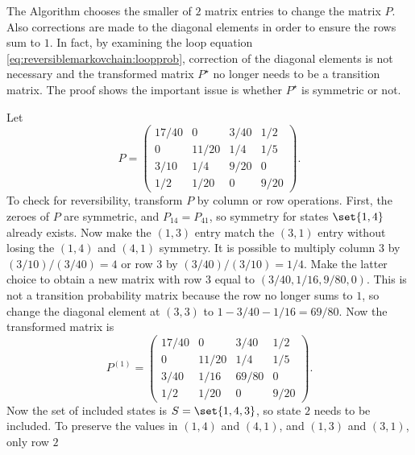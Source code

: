 \documentclass[12pt]{article}
\begin{document}
\begin{remark}
    The Algorithm chooses the smaller of \( 2 \) matrix entries to
    change the matrix \( P \).  Also corrections are made to the
    diagonal elements in order to ensure the rows sum to \( 1 \).  In
    fact, by examining the loop equation \eqref{eq:reversiblemarkovchain:loopprob},
    correction of the diagonal elements is not necessary and the
    transformed matrix \( P^{\star} \) no longer needs to be a
    transition matrix.  The proof shows the important issue is whether \(
    P^{\star} \) is symmetric or not.
\end{remark}

\begin{example}
    Let
    \[
        P =
        \begin{pmatrix}
            17/40       & 0     & 3/40  & 1/2 \\
            0   & 11/20 & 1/4   & 1/5 \\
            3/10        & 1/4   & 9/20  & 0 \\
            1/2 & 1/20  & 0     & 9/20
        \end{pmatrix}
        .
    \] To check for reversibility, transform \( P \) by column or row
    operations.  First, the zeroes of \( P \) are symmetric, and \( P_{14}
    = P_{41} \), so symmetry for states \( \set{1,4} \) already exists.
    Now make the \( (1,3) \) entry match the \( (3,1) \) entry without
    losing the \( (1,4) \) and \( (4,1) \) symmetry.  It is possible to
    multiply column \( 3 \) by \( (3/10)/(3/40) = 4 \) or row \( 3 \) by
    \( (3/40)/(3/10) = 1/4 \).  Make the latter choice to obtain a new
    matrix with row \( 3 \) equal to \( (3/40, 1/16, 9/80, 0) \).  This
    is not a transition probability matrix because the row no longer
    sums to \( 1 \), so change the diagonal element at \( (3,3) \) to \(
    1 - 3/40 - 1/16 = 69/80 \).  Now the transformed matrix is
    \[
        P^{(1)} =
        \begin{pmatrix}
            17/40       & 0     & 3/40  & 1/2 \\
            0   & 11/20 & 1/4   & 1/5 \\
            3/40        & 1/16  & 69/80 & 0 \\
            1/2 & 1/20  & 0     & 9/20
        \end{pmatrix}
        .
    \] Now the set of included states is \( S = \set{1,4,3} \), so state
    \( 2 \) needs to be included.  To preserve the values in \( (1,4) \)
    and \( (4,1) \), and \( (1,3) \) and \( (3,1) \), only row \( 2 \)

\end{example}
\end{document}
